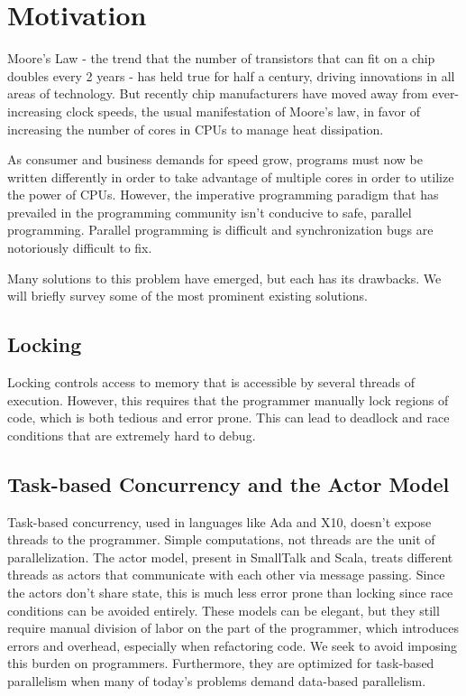 \section{Motivation}
Moore's Law - the trend that the number of transistors that can fit on
a chip doubles every 2 years - has held true for half a century,
driving innovations in all areas of technology. But recently chip
manufacturers have moved away from ever-increasing clock speeds, the
usual manifestation of Moore's law, in favor of increasing the number of cores in CPUs to manage heat dissipation.

As consumer and business demands for speed grow, programs must now be
written differently in order to take advantage of multiple cores in order to utilize the
power of CPUs. However, the imperative programming paradigm that has prevailed in the programming community isn't conducive to safe,
parallel programming. Parallel programming is difficult and
synchronization bugs are notoriously difficult to fix.

Many solutions to this problem have emerged, but each has its drawbacks. We will
briefly survey some of the most prominent existing solutions.

\subsection{Locking}
Locking controls access to memory that is accessible by several threads of
execution. However, this requires that the programmer manually lock regions of code, which is both tedious and error prone. This can lead to deadlock and race conditions that are extremely
hard to debug.

\subsection{Task-based Concurrency and the Actor Model}
Task-based concurrency, used in languages like Ada and X10, doesn't
expose threads to the programmer. Simple computations, not threads are
the unit of parallelization. The actor model, present in SmallTalk and
Scala, treats different threads as actors that communicate with each
other via message passing. Since the actors don't share state, this is
much less error prone than locking since race conditions can be
avoided entirely. These models can be elegant, but they still require
manual division of labor on the part of the programmer, which
introduces errors and overhead, especially when refactoring code. We
seek to avoid imposing this burden on programmers. Furthermore, they are
optimized for task-based parallelism when many of today's problems demand
data-based parallelism.

